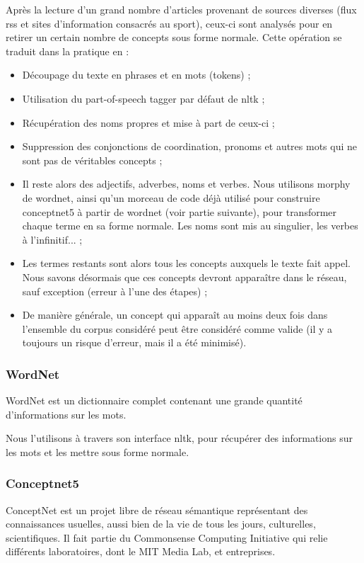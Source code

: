 \documentclass[a4paper,12pt]{article}
\begin{document}
Après la lecture d'un grand nombre d'articles provenant de sources diverses (flux rss et sites d'information consacrés au sport), ceux-ci sont analysés pour en retirer un certain nombre de concepts sous forme normale. Cette opération se traduit dans la pratique en :
\begin{itemize}
 \item Découpage du texte en phrases et en mots (tokens) ;
 \item Utilisation du part-of-speech tagger par défaut de nltk ;
 \item Récupération des noms propres et mise à part de ceux-ci ;
 \item Suppression des conjonctions de coordination, pronoms et autres mots qui ne sont pas de véritables concepts ;
 \item Il reste alors des adjectifs, adverbes, noms et verbes. Nous utilisons morphy de wordnet, ainsi qu'un morceau de code déjà utilisé pour construire conceptnet5 à partir de wordnet (voir partie suivante), pour transformer chaque terme en sa forme normale. Les noms sont mis au singulier, les verbes à l'infinitif... ;
 \item Les termes restants sont alors tous les concepts auxquels le texte fait appel. Nous savons désormais que ces concepts devront apparaître dans le réseau, sauf exception (erreur à l'une des étapes) ;
 \item De manière générale, un concept qui apparaît au moins deux fois dans l'ensemble du corpus considéré peut être considéré comme valide (il y a toujours un risque d'erreur, mais il a été minimisé).
\end{itemize}


\subsubsection{WordNet}

WordNet est un dictionnaire complet contenant une grande quantité d'informations sur les mots.

Nous l'utilisons à travers son interface nltk, pour récupérer des informations sur les mots et les mettre sous forme normale.


\subsubsection{Conceptnet5}

ConceptNet est un projet libre de réseau sémantique représentant des connaissances usuelles, aussi bien de la vie de tous les jours, culturelles, scientifiques. Il fait partie du Commonsense Computing Initiative qui relie différents laboratoires, dont le MIT Media Lab, et entreprises.
\end{document}
